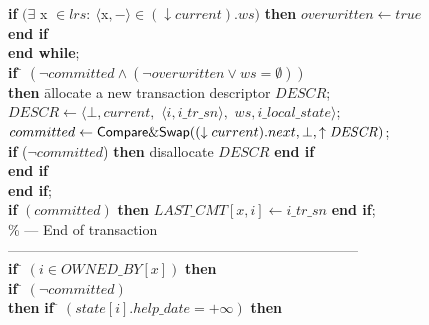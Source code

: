 \begin{figure}[h!]
{{\begin{minipage}[t]{150mm}
\begin{tabbing}
 \> \> \> {\bf if} 
    $(\exists$ {\sc x} $\in \mathit{lrs}:
               ~ \langle${\sc x}$,-\rangle \in (\downarrow current).ws)$
    {\bf then}  $overwritten  \leftarrow \mathit{true}$  {\bf end if} \\


 \>\>  {\bf end while};\\


 \>\>  {\bf if} \= $(\neg committed \wedge
                    ( \neg overwritten \vee ws=\emptyset))$\\


 \>  \>\> {\bf then} \=
   allocate a new transaction descriptor $\mathit{DESCR}$;\\


 \> \> \>\> $\mathit{DESCR} \leftarrow   
\langle  \bot, current,$ $\langle i, i\_tr\_sn \rangle,$ 
                       $ws,i\_local\_state \rangle$;\\
 

 \> \> \>\> $committed \leftarrow 
 {\sf Compare\&Swap}((\downarrow current).next, 
                     \bot,\uparrow \mathit{DESCR})$;\\


 \> \> \>\> {\bf if} ($\neg committed$) 
   {\bf then} disallocate  $\mathit{DESCR}$ {\bf end if}\\



 \> \> {\bf end if}\\

 \> {\bf end if};\\

 \> {\bf if} $(committed)$  {\bf then}
            $\mathit{LAST\_CMT}[x,i] \leftarrow i\_tr\_sn$  {\bf end if};\\

\>\> \% --- End of transaction --------------------------------------------------------------------------- \\


 \> {\bf if} \= $(i\in \mathit{OWNED\_BY}[x])$  {\bf then} \\


 \> \>  {\bf if} \= $(\neg committed)$ \\

 \> \> \> 
     {\bf then} \= {\bf if} \= $(state[i].help\_date =+\infty)$ {\bf then} \\


\end{tabbing}
\end{minipage}}}
\end{figure}
